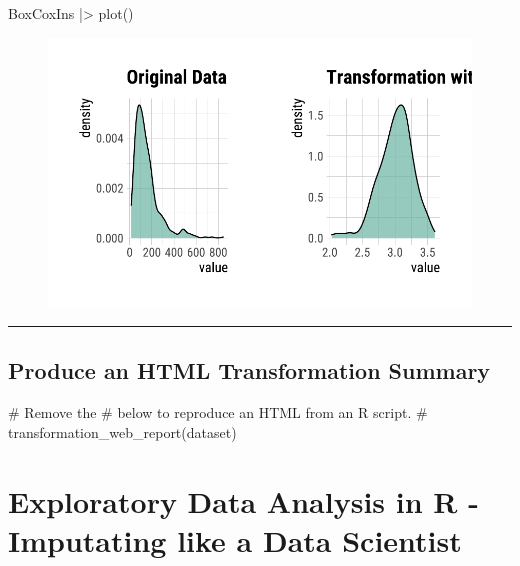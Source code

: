 \documentclass[
  letterpaper,
  DIV=11,
  numbers=noendperiod]{scrreprt}
\newenvironment{Shaded}{\begin{snugshade}}{\end{snugshade}}
\newcommand{\CommentTok}[1]{\textcolor[rgb]{0.37,0.37,0.37}{#1}}
\newcommand{\FunctionTok}[1]{\textcolor[rgb]{0.28,0.35,0.67}{#1}}
\newcommand{\NormalTok}[1]{\textcolor[rgb]{0.00,0.23,0.31}{#1}}
\newcommand{\SpecialCharTok}[1]{\textcolor[rgb]{0.37,0.37,0.37}{#1}}
\begin{document}
\begin{Shaded}
\begin{Highlighting}[]
\NormalTok{BoxCoxIns }\SpecialCharTok{|\textgreater{}}
  \FunctionTok{plot}\NormalTok{()}
\end{Highlighting}
\end{Shaded}

\begin{figure}[H]

{\centering \includegraphics{./TransformingLikeDataTrans_files/figure-pdf/unnamed-chunk-15-1.pdf}

}

\end{figure}

\begin{center}\rule{0.5\linewidth}{0.5pt}\end{center}

\hypertarget{produce-an-html-transformation-summary}{%
\section{Produce an HTML Transformation
Summary}\label{produce-an-html-transformation-summary}}

\begin{Shaded}
\begin{Highlighting}[]
\CommentTok{\# Remove the \textquotesingle{}\#\textquotesingle{} below to reproduce an HTML from an R script. }
\CommentTok{\# transformation\_web\_report(dataset)}
\end{Highlighting}
\end{Shaded}


\hypertarget{exploratory-data-analysis-in-r---imputating-like-a-data-scientist-1}{%
\chapter{Exploratory Data Analysis in R - Imputating like a Data
Scientist}\label{exploratory-data-analysis-in-r---imputating-like-a-data-scientist-1}}
\end{document}

